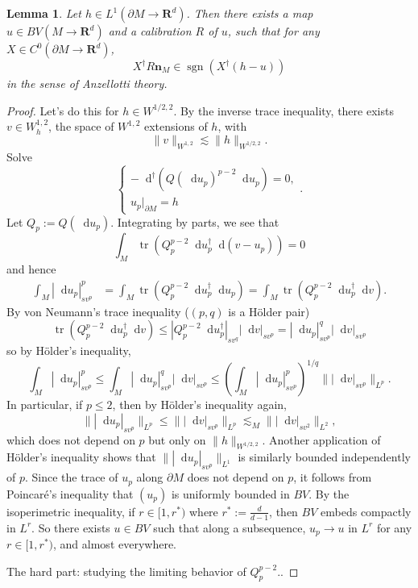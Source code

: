 \documentclass[reqno,11pt]{amsart}
\newcommand{\RR}{\mathbf{R}}
\newcommand*\dif{\mathop{}\!\mathrm{d}}
\DeclareMathOperator{\tr}{tr}
\newcommand{\normal}{\mathbf n}
\newcommand{\sgn}{\operatorname{sgn}}
\newtheorem{lemma}[theorem]{Lemma}
\theoremstyle{definition}
\numberwithin{equation}{section}
\begin{document}
\begin{lemma}\label{existence}
Let $h \in L^1(\partial M \to \RR^d)$.
Then there exists a map $u \in BV(M \to \RR^d)$ and a calibration $R$ of $u$, such that for any $X \in C^0(\partial M \to \RR^d)$,
\begin{equation}\label{Dirichlet condition}
X^\dagger R\normal_M \in \sgn(X^\dagger(h - u))
\end{equation}
in the sense of Anzellotti theory.
\end{lemma}
\begin{proof}
Let's do this for $h \in W^{1/2, 2}$.
By the inverse trace inequality, there exists $v \in W^{1, 2}_h$, the space of $W^{1, 2}$ extensions of $h$, with 
$$\|v\|_{W^{1, 2}} \lesssim \|h\|_{W^{1/2, 2}}.$$
Solve
$$\begin{cases}
-\dif^\dagger (Q(\dif u_p)^{p - 2} \dif u_p) = 0, \\
u_p|_{\partial M} = h 
\end{cases}.$$
Let $Q_p := Q(\dif u_p)$.
Integrating by parts, we see that 
$$\int_M \tr(Q_p^{p - 2} \dif u_p^\dagger \dif(v - u_p)) = 0$$
and hence
\begin{align*}
\int_M |\dif u_p|_{sv^p}^p
&= \int_M \tr(Q_p^{p - 2} \dif u_p^\dagger \dif u_p)
= \int_M \tr(Q_p^{p - 2} \dif u_p^\dagger \dif v).
\end{align*}
By von Neumann's trace inequality ($(p, q)$ is a H\"older pair)
$$\tr(Q_p^{p - 2} \dif u_p^\dagger \dif v) \leq |Q_p^{p - 2} \dif u_p^\dagger|_{sv^q} |\dif v|_{sv^p} = |\dif u_p|_{sv^p}^q |\dif v|_{sv^p}$$
so by H\"older's inequality,
$$\int_M |\dif u_p|_{sv^p}^p \leq \int_M |\dif u_p|_{sv^p}^q |\dif v|_{sv^p} \leq \left(\int_M |\dif u_p|_{sv^p}^p\right)^{1/q} \||\dif v|_{sv^p}\|_{L^p}.$$
In particular, if $p \leq 2$, then by H\"older's inequality again,
$$\||\dif u_p|_{sv^p}\|_{L^p} \leq \||\dif v|_{sv^p}\|_{L^p} \lesssim_M \||\dif v|_{sv^2}\|_{L^2},$$
which does not depend on $p$ but only on $\|h\|_{W^{1/2, 2}}$.
Another application of H\"older's inequality shows that $\||\dif u_p|_{sv^p}\|_{L^1}$ is similarly bounded independently of $p$.
Since the trace of $u_p$ along $\partial M$ does not depend on $p$, it follows from Poincar\'e's inequality that $(u_p)$ is uniformly bounded in $BV$.
By the isoperimetric inequality, if $r \in [1, r^*)$ where $r^* := \frac{d}{d - 1}$, then $BV$ embeds compactly in $L^r$.
So there exists $u \in BV$ such that along a subsequence, $u_p \to u$ in $L^r$ for any $r \in [1, r^*)$, and almost everywhere.

The hard part: studying the limiting behavior of $Q_p^{p - 2}$..
\end{proof}
\end{document}
